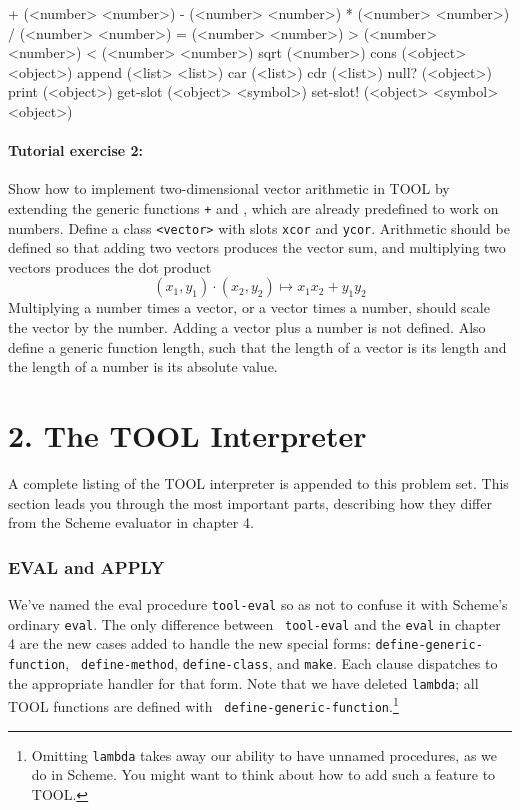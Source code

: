 \beginlisp
+         (<number> <number>)
-         (<number> <number>)
*         (<number> <number>)
/         (<number> <number>)
=         (<number> <number>)
>         (<number> <number>)
<         (<number> <number>)
sqrt      (<number>)
cons      (<object> <object>)
append    (<list> <list>)
car       (<list>)
cdr       (<list>)
null?     (<object>)
print     (<object>)
get-slot  (<object> <symbol>)
set-slot! (<object> <symbol> <object>)
\endlisp

\paragraph{Tutorial exercise 2:} Show how to implement
two-dimensional vector arithmetic in TOOL by extending the generic
functions {\tt +} and {\tt *}, which are already predefined to work
on numbers.  Define a class {\tt <vector>} with slots {\tt xcor} and
{\tt ycor}.  Arithmetic should be defined so that adding two vectors
produces the vector sum, and multiplying two vectors produces the dot
product
\begin{displaymath}
(x_1,y_1)\cdot (x_2,y_2) \mapsto x_1x_2+y_1y_2
\end{displaymath}
Multiplying
a number times a vector, or a vector times a number, should scale the
vector by the number.  Adding a vector plus a number is not defined.
Also define a generic function length, such that the length of a
vector is its length and the length of a number is its absolute value.


\section{2. The TOOL Interpreter}

A complete listing of the TOOL interpreter is appended to this problem
set.  This section leads you through the most important parts,
describing how they differ from the Scheme evaluator in chapter 4.

\subsubsection{EVAL and APPLY}

We've named the eval procedure {\tt tool-eval} so as not to confuse it
with Scheme's ordinary {\tt eval}.  The only difference between {\tt
tool-eval} and the {\tt eval} in chapter 4 are the new cases added to
handle the new special forms: {\tt define-generic-function}, {\tt
define-method}, {\tt define-class}, and {\tt make}.  Each clause dispatches
to the appropriate handler for that form.  Note that we have deleted
{\tt lambda}; all TOOL functions are defined with {\tt
define-generic-function}.\footnote{Omitting {\tt lambda} takes away
our ability to have unnamed procedures, as we do in Scheme.  You might
want to think about how to add such a feature to TOOL.}

